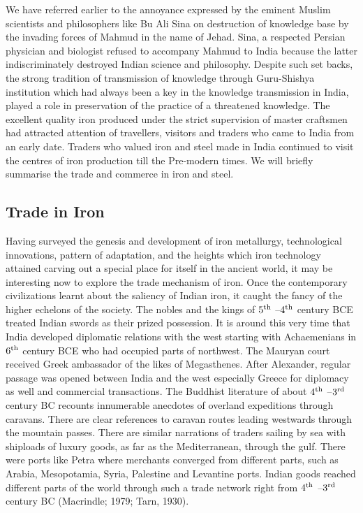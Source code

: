We have referred earlier to the annoyance expressed by the eminent Muslim scientists and philosophers like Bu Ali Sina on destruction of knowledge base by the invading forces of Mahmud in the name of Jehad. Sina, a respected Persian physician and biologist refused to accompany Mahmud to India because the latter indiscriminately destroyed Indian science and philosophy. Despite such set backs, the strong tradition of transmission of knowledge through Guru-Shishya institution which had always been a key in the knowledge transmission in India, played a role in preservation of the practice of a threatened knowledge. The excellent quality iron produced under the strict supervision of master craftsmen had attracted attention of travellers, visitors and traders who came to India from an early date.  Traders who valued iron and steel made in India continued to visit the centres of iron production till the Pre-modern times. We will briefly summarise the trade and commerce in iron and steel.

\vspace{-.3cm}

\subsection*{Trade in Iron}\label{chapter8-subsection-2}

\vspace{-.2cm}


Having surveyed the genesis and development of iron metallurgy, technological innovations, pattern of adaptation, and the heights which iron technology attained carving out a special place for itself in the ancient world, it may be interesting now to explore the trade mechanism of iron. Once the contemporary civilizations learnt about the saliency of Indian iron, it caught the fancy of the higher echelons of the society. The nobles and the kings of $5^{\rm th}$ –$4^{\rm th}$ century BCE treated Indian swords as their prized possession. It is around this very time that India developed diplomatic relations with the west starting with Achaemenians in $6^{\rm th}$ century BCE who had occupied parts of northwest. The Mauryan court received Greek ambassador of the likes of Megasthenes. After Alexander, regular passage was opened between India and the west especially Greece for diplomacy as well and commercial transactions. The Buddhist literature of about $4^{\rm th}$ –$3^{\rm rd}$ century BC recounts innumerable anecdotes of overland expeditions through caravans. There are clear references to caravan routes leading westwards through the mountain passes. There are similar narrations of traders sailing by sea with shiploads of luxury goods, as far as the Mediterranean, through the gulf. There were ports like Petra where merchants converged from different parts, such as Arabia, Mesopotamia, Syria, Palestine and Levantine ports. Indian goods reached different parts of the world through such a trade network right from $4^{\rm th}$ –$3^{\rm rd}$ century BC (Macrindle; 1979; Tarn, 1930).

